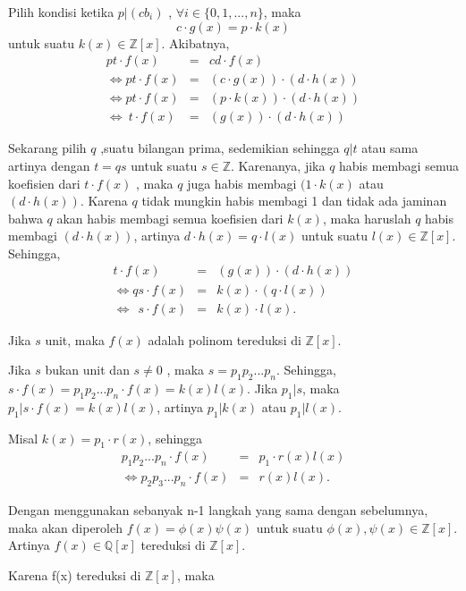 \par 	Pilih kondisi ketika $p| (cb_i)$ , $\forall i \in \{0,1,...,n\}$, maka $$c \cdot g(x) = p \cdot k(x) $$ untuk suatu $k(x) \in \mathbb{Z}[x]$. Akibatnya, 
	$$\begin{array}{rcl}
	pt \cdot f(x) &=& cd\cdot f(x)\\
	\iff pt \cdot f(x) &=& (c\cdot g(x)) \cdot (d\cdot h(x))\\
	\iff pt \cdot f(x) &=& (p\cdot k(x)) \cdot (d\cdot h(x))\\
	\iff ~t \cdot f(x) &=&(g(x)) \cdot (d\cdot h(x))
	\end{array}$$
\par 	Sekarang pilih $q$ ,suatu bilangan prima, sedemikian sehingga $q|t$ atau sama artinya dengan $t = qs$ untuk suatu $s \in \mathbb{Z}$. Karenanya, jika $q$ habis membagi semua koefisien dari $t\cdot f(x)$ , maka $q$ juga habis membagi $(1\cdot k(x)$ atau $			(d \cdot h(x))$. Karena $q$ tidak mungkin habis membagi 1 dan tidak ada jaminan bahwa $q$ akan habis membagi semua koefisien dari $k(x)$, maka haruslah $q$ habis membagi $(d\cdot h(x))$, artinya $d\cdot h(x) = q\cdot l(x)$ untuk suatu $l(x)\in \mathbb{Z}[x].$ 			Sehingga,
	$$\begin{array}{rcl}
	t \cdot f(x) &=&(g(x)) \cdot (d\cdot h(x))\\
	\iff qs\cdot f(x) &=&  k(x)\cdot (q\cdot l(x))\\
	\iff ~~s\cdot f(x) &=& k(x) \cdot l(x).
	\end{array}$$
\par 	Jika $s$ unit, maka $f(x)$ adalah polinom tereduksi di $\mathbb{Z}[x]$.
\par 	Jika $s$ bukan unit dan $s\ne 0$ , maka $s=p_1p_2...p_n$. Sehingga, $s\cdot f(x) = p_1p_2...p_n\cdot f(x) = k(x)l(x)$. Jika $p_1|s$, maka $p_1|s\cdot f(x) = k(x)l(x)$, artinya $p_1|k(x)$ atau $p_1|l(x)$.
\par 	Misal $k(x) = p_1\cdot r(x)$, sehingga
	$$\begin{array}{rcl}
	p_1p_2...p_n \cdot f(x) &=& p_1\cdot r(x)l(x)\\
	\iff p_2p_3...p_n \cdot f(x) &=& r(x)l(x).
	\end{array}$$
\par 	Dengan menggunakan sebanyak n-1 langkah yang sama dengan sebelumnya, maka akan diperoleh $f(x)=\phi (x)\psi (x)$ untuk suatu $\phi(x),\psi(x) \in \mathbb{Z}[x]$. Artinya $f(x)\in \mathbb{Q}[x]$ tereduksi di $\mathbb{Z}[x]$.
\par 	Karena f(x) tereduksi di $\mathbb{Z}[x]$, maka
